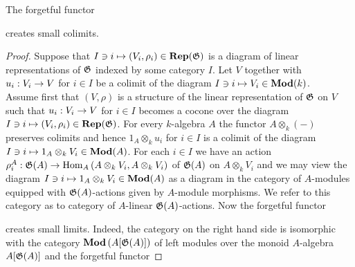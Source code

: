 \begin{theorem}\label{theorem:forgetful_functor_from_reps_creates_colmits_and_flimits}
The forgetful functor
\begin{center}
\end{center}
creates small colimits.
\end{theorem}
\begin{proof}
Suppose that $I\ni i\mapsto (V_i,\rho_i)\in \mathbf{Rep}({\mathfrak G})$ is a diagram of linear representations of ${\mathfrak G}$ indexed by some category $I$. Let $V$ together with $u_i:V_i\rightarrow V$ for $i\in I$ be a colimit of the diagram $I\ni i\mapsto V_i\in \mathbf{Mod}(k)$.\\
Assume first that $(V,\rho)$ is a structure of the linear representation of ${\mathfrak G}$ on $V$ such that $u_i:V_i\rightarrow V$ for $i\in I$ becomes a cocone over the diagram $I\ni i\mapsto (V_i,\rho_i)\in \mathbf{Rep}({\mathfrak G})$. For every $k$-algebra $A$ the functor $A\otimes_k(-)$ preserves colimits and hence $1_A\otimes_ku_i$ for $i\in I$ is a colimit of the diagram $I\ni i \mapsto 1_A\otimes_kV_i\in \mathbf{Mod}(A)$. For each $i\in I$ we have an action $\rho_i^A:{\mathfrak G}(A)\rightarrow \mathrm{Hom}_A\left(A\otimes_kV_i, A\otimes_kV_i\right)$ of ${\mathfrak G}(A)$ on $A\otimes_kV_i$ and we may view the diagram $I\ni i \mapsto 1_A\otimes_kV_i\in \mathbf{Mod}(A)$ as a diagram in the category of $A$-modules equipped with ${\mathfrak G}(A)$-actions given by $A$-module morphisms. We refer to this category as to category of $A$-linear ${\mathfrak G}(A)$-actions. Now the forgetful functor
\begin{center}
\end{center}
creates small limits. Indeed, the category on the right hand side is isomorphic with the category $\mathbf{Mod}\left(A[{\mathfrak G}(A)]\right)$ of left modules over the monoid $A$-algebra $A[{\mathfrak G}(A)]$ and the forgetful functor

\end{proof}
